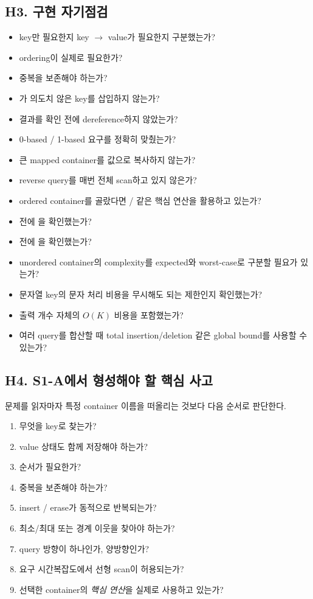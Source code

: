 \subsection{H3. 구현 자기점검}
\begin{checklistbox}[S1-A 코드 작성 후 체크리스트]
\begin{itemize}
\item[$\square$] key만 필요한지 key $\to$ value가 필요한지 구분했는가?
\item[$\square$] ordering이 실제로 필요한가?
\item[$\square$] 중복을 보존해야 하는가?
\item[$\square$] 가 의도치 않은 key를 삽입하지 않는가?
\item[$\square$]  결과를  확인 전에 dereference하지 않았는가?
\item[$\square$] 0-based / 1-based 요구를 정확히 맞췄는가?
\item[$\square$] 큰 mapped container를 값으로 복사하지 않는가?
\item[$\square$] reverse query를 매번 전체 scan하고 있지 않은가?
\item[$\square$] ordered container를 골랐다면 / 같은 핵심 연산을 활용하고 있는가?
\item[$\square$]  전에 을 확인했는가?
\item[$\square$]  전에 을 확인했는가?
\item[$\square$] unordered container의 complexity를 expected와 worst-case로 구분할 필요가 있는가?
\item[$\square$] 문자열 key의 문자 처리 비용을 무시해도 되는 제한인지 확인했는가?
\item[$\square$] 출력 개수 자체의 $O(K)$ 비용을 포함했는가?
\item[$\square$] 여러 query를 합산할 때 total insertion/deletion 같은 global bound를 사용할 수 있는가?
\end{itemize}
\end{checklistbox}

\subsection{H4. S1-A에서 형성해야 할 핵심 사고}
문제를 읽자마자 특정 container 이름을 떠올리는 것보다 다음 순서로 판단한다.
\begin{enumerate}
\item 무엇을 key로 찾는가?
\item value 상태도 함께 저장해야 하는가?
\item 순서가 필요한가?
\item 중복을 보존해야 하는가?
\item insert / erase가 동적으로 반복되는가?
\item 최소/최대 또는 경계 이웃을 찾아야 하는가?
\item query 방향이 하나인가, 양방향인가?
\item 요구 시간복잡도에서 선형 scan이 허용되는가?
\item 선택한 container의 \emph{핵심 연산}을 실제로 사용하고 있는가?
\end{enumerate}

